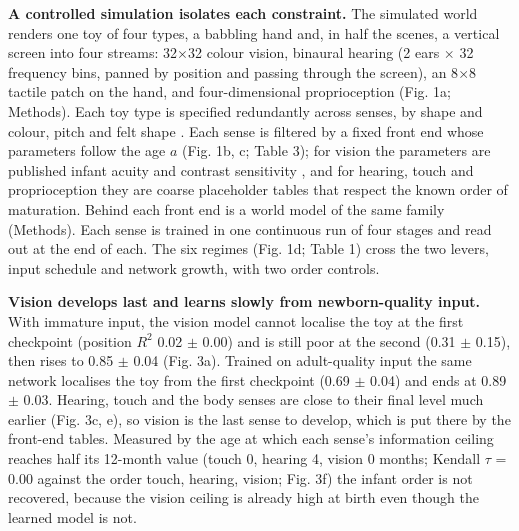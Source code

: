 \documentclass{article}
\begin{document}
\textbf{A controlled simulation isolates each constraint.} The simulated world renders one toy of four types, a babbling hand and, in half the scenes, a vertical screen into four streams: 32\ensuremath{\times}32 colour vision, binaural hearing (2 ears \ensuremath{\times} 32 frequency bins, panned by position and passing through the screen), an 8\ensuremath{\times}8 tactile patch on the hand, and four-dimensional proprioception (Fig. 1a; Methods). Each toy type is specified redundantly across senses, by shape and colour, pitch and felt shape \autocite{bahrick2000intersensory}. Each sense is filtered by a fixed front end whose parameters follow the age \(a\) (Fig. 1b, c; Table 3); for vision the parameters are published infant acuity and contrast sensitivity \autocite{norcia1985spatial,banks1988optical}, and for hearing, touch and proprioception they are coarse placeholder tables that respect the known order of maturation. Behind each front end is a world model of the same family (Methods). Each sense is trained in one continuous run of four stages and read out at the end of each. The six regimes (Fig. 1d; Table 1) cross the two levers, input schedule and network growth, with two order controls.

\textbf{Vision develops last and learns slowly from newborn-quality input.} With immature input, the vision model cannot localise the toy at the first checkpoint (position \(R^2\) 0.02 \ensuremath{\pm} 0.00) and is still poor at the second (0.31 \ensuremath{\pm} 0.15), then rises to 0.85 \ensuremath{\pm} 0.04 (Fig. 3a). Trained on adult-quality input the same network localises the toy from the first checkpoint (0.69 \ensuremath{\pm} 0.04) and ends at 0.89 \ensuremath{\pm} 0.03. Hearing, touch and the body senses are close to their final level much earlier (Fig. 3c, e), so vision is the last sense to develop, which is put there by the front-end tables. Measured by the age at which each sense's information ceiling reaches half its 12-month value (touch 0, hearing 4, vision 0 months; Kendall \(\tau\) = 0.00 against the order touch, hearing, vision; Fig. 3f) the infant order is not recovered, because the vision ceiling is already high at birth even though the learned model is not.
\end{document}
